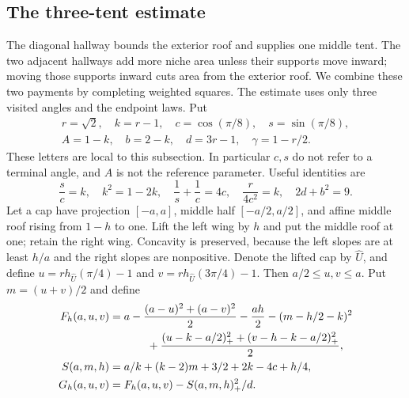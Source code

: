 \subsection{The three-tent estimate}

The diagonal hallway bounds the exterior roof and supplies one middle
tent. The two adjacent hallways add more niche area unless their
supports move inward; moving those supports inward cuts area from the
exterior roof. We combine these two payments by completing weighted
squares. The estimate uses only three visited angles and the endpoint
laws. Put
\[
 \begin{gathered}
 r=\sqrt2,\quad k=r-1,\quad c=\cos(\pi/8),\quad s=\sin(\pi/8),\\
 A=1-k,\quad b=2-k,\quad d=3r-1,\quad \gamma=1-r/2.
 \end{gathered}
\]
These letters are local to this subsection. In particular $c,s$ do
not refer to a terminal angle, and $A$ is not the reference parameter.
Useful identities are
\begin{equation}\label{eq:three-tent-constants}
 \frac sc=k,\quad k^2=1-2k,\quad \frac1s+\frac1c=4c,
 \quad \frac r{4c^2}=k,\quad 2d+b^2=9.
\end{equation}
Let a cap have projection $[-a,a]$, middle half $[-a/2,a/2]$,
and affine middle roof rising from $1-h$ to one. Lift the left wing
by $h$ and put the middle roof at one; retain the right wing.
Concavity is preserved, because the left slopes are at least $h/a$
and the right slopes are nonpositive. Denote the lifted cap by
$\widehat U$, and define
$u=rh_{\widehat U}(\pi/4)-1$ and
$v=rh_{\widehat U}(3\pi/4)-1$.
Then $a/2\le u,v\le a$. Put $m=(u+v)/2$ and define
\begin{align}\label{eq:three-tent-objective}
 F_h(a,u,v)&=a-\frac{(a-u)^2+(a-v)^2}{2}-\frac{ah}{2}
 -(m-h/2-k)^2\notag\\
 &\hspace{12mm}+\frac{(u-k-a/2)_+^2+(v-h-k-a/2)_+^2}{2},\\
 S(a,m,h)&=a/k+(k-2)m+3/2+2k-4c+h/4,\notag\\
 G_h(a,u,v)&=F_h(a,u,v)-S(a,m,h)_+^2/d.\notag
\end{align}

